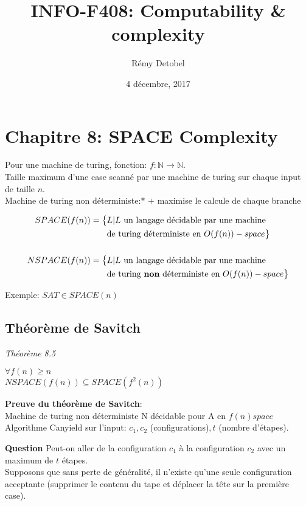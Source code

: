 \documentclass[a4paper,12pt]{article}
\title{INFO-F408: Computability \& complexity}
\date{4 décembre, 2017}
\author{Rémy Detobel}
\begin{document}
\maketitle
\newpage

\section{Chapitre 8: SPACE Complexity}
  Pour une machine de turing, fonction: $f: \mathbb{N} \rightarrow \mathbb{N}$.\\
  Taille maximum d'une case scanné par une machine de turing sur chaque input de taille $n$.\\
  
  Machine de turing non déterministe:$*$ $+$ maximise le calcule de chaque branche
  
  \begin{align*}
    SPACE(f(n)) = \big\{&L | L \text{ un langage décidable par une machine}\\
    &\text{de turing déterministe en } O(f(n))-space \big\}\\
    \\
    NSPACE(f(n)) = \big\{&L | L \text{ un langage décidable par une machine}\\
    &\text{de turing \textbf{non} déterministe en } O(f(n))-space \big\}
  \end{align*}
  
  Exemple: $SAT \in SPACE(n)$
  
  \subsection{Théorème de Savitch}
    \textit{Théorème 8.5}
    \begin{theoremeBox}
      $\forall f(n) \geq n$\\
      $NSPACE(f(n)) \subseteq SPACE(f^2(n))$
    \end{theoremeBox}

    \textbf{Preuve du théorème de Savitch}:\\
    Machine de turing non déterministe N décidable pour A en $f(n) space$\\
    Algorithme Canyield sur l'input: $c_1, c_2$ (configurations)$, t$ (nombre d'étapes).
    
    \textbf{Question} Peut-on aller de la configuration $c_1$ à la configuration $c_2$ avec un maximum de $t$ étapes.\\
    Supposons que sans perte de généralité, il n'existe qu'une seule configuration acceptante (supprimer le contenu du tape et déplacer la tête sur la première case).\\
    
\end{document}

